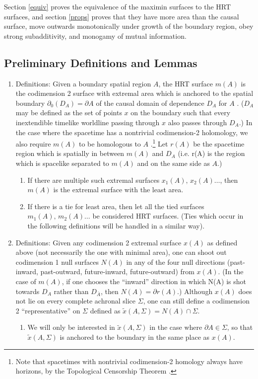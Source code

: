 \documentclass{article}
\begin{document}
Section \ref{equiv} proves the equivalence of the maximin surfaces to the HRT surfaces, and section \ref{props} proves that they have more area than the causal surface, move outwards monotonically under growth of the boundary region, obey strong subadditivity, and monogamy of mutual information.

\subsection{Preliminary Definitions and Lemmas}\label{pre}

\begin{enumerate}

\item \label{1} Definitions: Given a boundary spatial region $A$, the HRT surface $m(A)$ is the codimension 2 surface with extremal area which is anchored to the spatial boundary $\partial_0(D_A) = \partial A$ of the causal domain of dependence $D_A$ for $A$ \cite{HRT07}.  ($D_A$ may be defined as the set of points $x$ on the boundary such that every inextendible timelike worldline passing through $x$ also passes through $D_A$.)  In the case where the spacetime has a nontrivial codimension-2 holomology, we also require $m(A)$ to be homologous to $A$ \cite{HT07,fursaev06}.\footnote{Note that spacetimes with nontrivial codimension-2 homology always have horizons, by the Topological Censorship Theorem \cite{top}.}  Let $r(A)$ be the spacetime region which is spatially in between $m(A)$ and $D_A$ (i.e. r(A) is the region which is spacelike separated to $m(A)$ and on the same side as $A$.)
	\begin{enumerate}
	\item If there are multiple such extremal surfaces $x_1(A),\,x_2(A) \ldots$, then $m(A)$ is the extremal surface with the least area.
	\item If there is a tie for least area, then let all the tied surfaces $m_1(A),\,m_2(A) \ldots$ be considered HRT surfaces.  (Ties which occur in the following definitions will be handled in a similar way).
	\end{enumerate}
\item Definitions: Given any codimension 2 extremal surface $x(A)$ as defined above (not necessarily the one with minimal area), one can shoot out codimension 1 null surfaces $N(A)$ in any of the four null directions (past-inward, past-outward, future-inward, future-outward) from $x(A)$.  (In the case of $m(A)$, if one chooses the ``inward'' direction in which N(A) is shot towards $D_A$ rather than $D_{\bar{A}}$, then $N(A) = \partial r(A)$.)  Although $x(A)$ does not lie on every complete achronal slice $\Sigma$, one can still define a codimension 2 ``representative'' on $\Sigma$ defined as $\tilde{x}(A,\Sigma) = N(A) \cap \Sigma$.
	\begin{enumerate}
	\item We will only be interested in $\tilde{x}(A,\Sigma)$ in the case where $\partial A \in \Sigma$, so that $\tilde{x}(A,\Sigma)$ is anchored to the boundary in the same place as $x(A)$.  	
	\end{enumerate}


\end{enumerate}
\end{document}
